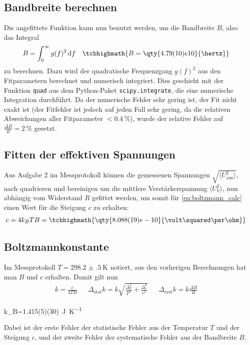 \subsection{Bandbreite berechnen}
Die angefittete Funktion kann nun benutzt werden, um die Bandbreite \(B\), also das Integral 
\begin{align}
    B=\int_0^\infty g(f)^2 \diff f && \tcbhighmath{B=\qty{4.79(10)e10}{\hertz}}
\end{align}
zu berechnen. Dazu wird der quadratische Frequenzgang \(g(f)^2\) aus den Fitparametern berechnet und numerisch integriert. Dies geschieht mit der Funktion \verb|quad| aus dem Python-Paket \verb|scipy.integrate|, die eine numerische Integration durchführt. Da der numerische Fehler sehr gering ist, der Fit nicht exakt ist (der Fitfehler ist jedoch auf jeden Fall sehr gering, da die relativen Abweichungen aller Fitparameter \(<\qty{0.4}{\percent}\)), wurde der relative Fehler auf \(\frac{\Delta B}{B}=\qty{2}{\percent}\) gesetzt.   

\subsection{Fitten der effektiven Spannungen}
Aus Aufgabe 2 im Messprotokoll können die gemessenen Spannungen \(\sqrt{\langle U_\text{aus}^2 \rangle}\), nach quadrieren und bereinigen um die mittlere Verstärkerspannung \(\langle U_V^2 \rangle\), nun abhängig vom Widerstand \(R\) gefittet werden, um somit für \cref{eq:boltzmann_calc} einen Wert für die Steigung \(c\) zu erhalten:
\begin{equation}
    c=4k_BTB=\tcbhighmath{\qty{8.088(19)e-10}{\volt\squared\per\ohm}}  
\end{equation}

\subsection{Boltzmannkonstante}
Im Messprotokoll \(T=\qty{298.2(5)}{\kelvin}\) notiert, aus den vorherigen Berechnungen hat man \(B\) und \(c\) erhalten. Damit gilt nun
\begin{align}
    k=\frac{c}{4TB}&&\Delta_\text{stat} k=k\sqrt{\frac{\Delta_{T}^{2}}{T^{2}} + \frac{\Delta_{c}^{2}}{c^{2}}}&&\Delta_\text{syst} k=k\frac{\Delta B}{B}
\end{align}
\begin{rb}
k_B=\qty{1.415(5)(30)}{\joule\per\kelvin}
\end{rb}
Dabei ist der erste Fehler der statistische Fehler aus der Temperatur \(T\) und der Steigung \(c\), und der zweite Fehler der systematische Fehler aus der Bandbreite \(B\). 

